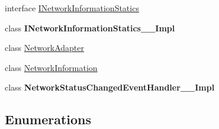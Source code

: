 \begin{DoxyCompactItemize}
\item 
interface \hyperlink{interface_windows_1_1_networking_1_1_connectivity_1_1_i_network_information_statics}{I\+Network\+Information\+Statics}
\item 
class {\bfseries I\+Network\+Information\+Statics\+\_\+\+\_\+\+Impl}
\item 
class \hyperlink{class_windows_1_1_networking_1_1_connectivity_1_1_network_adapter}{Network\+Adapter}
\item 
class \hyperlink{class_windows_1_1_networking_1_1_connectivity_1_1_network_information}{Network\+Information}
\item 
class {\bfseries Network\+Status\+Changed\+Event\+Handler\+\_\+\+\_\+\+Impl}
\end{DoxyCompactItemize}
\subsection*{Enumerations}
